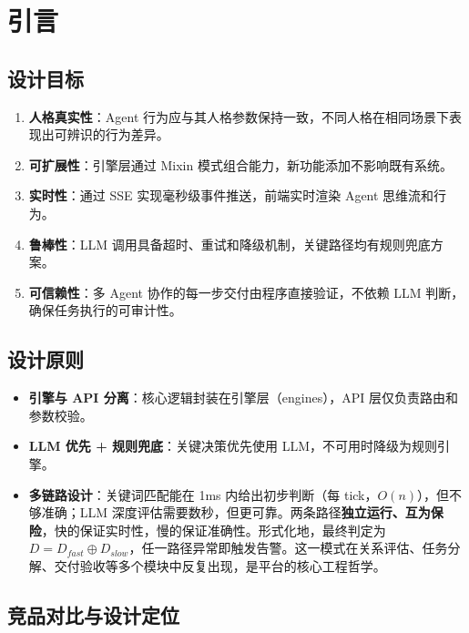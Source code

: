 \documentclass[12pt,a4paper]{article}%
\begin{document}
\newpage
\tableofcontents
	
\newpage

\section{引言}

\subsection{设计目标}

\begin{enumerate}
	\item \textbf{人格真实性}：Agent 行为应与其人格参数保持一致，不同人格在相同场景下表现出可辨识的行为差异。
	\item \textbf{可扩展性}：引擎层通过 Mixin 模式组合能力，新功能添加不影响既有系统。
	\item \textbf{实时性}：通过 SSE 实现毫秒级事件推送，前端实时渲染 Agent 思维流和行为。
	\item \textbf{鲁棒性}：LLM 调用具备超时、重试和降级机制，关键路径均有规则兜底方案。
	\item \textbf{可信赖性}：多 Agent 协作的每一步交付由程序直接验证，不依赖 LLM 判断，确保任务执行的可审计性。
\end{enumerate}

\subsection{设计原则}

\begin{itemize}
	\item \textbf{引擎与 API 分离}：核心逻辑封装在引擎层（engines），API 层仅负责路由和参数校验。
	\item \textbf{LLM 优先 + 规则兜底}：关键决策优先使用 LLM，不可用时降级为规则引擎。
	\item \textbf{多链路设计}：关键词匹配能在 1ms 内给出初步判断（每 tick，$O(n)$），但不够准确；LLM 深度评估需要数秒，但更可靠。两条路径\textbf{独立运行、互为保险}，快的保证实时性，慢的保证准确性。形式化地，最终判定为 $D = D_{fast} \oplus D_{slow}$，任一路径异常即触发告警。这一模式在关系评估、任务分解、交付验收等多个模块中反复出现，是平台的核心工程哲学。
\end{itemize}

\subsection{竞品对比与设计定位}
\end{document}
